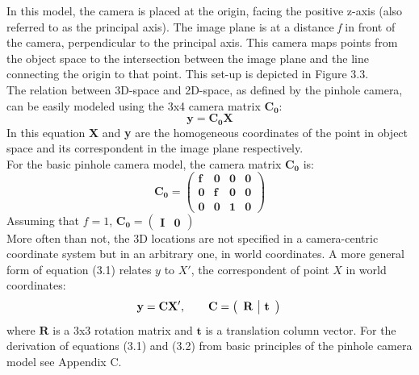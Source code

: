\documentclass[12pt,a4paper,twoside,openright]{report}
\begin{document}
In this model, the camera is placed at the origin, facing the positive z-axis (also referred to as the principal axis). The image plane is at a distance \emph{f} in front of the camera, perpendicular to the principal axis. This camera maps points from the object space to the intersection between the image plane and the line connecting the origin to that point. This set-up is depicted in Figure 3.3.\\
\linebreak
The relation between 3D-space and 2D-space, as defined by the pinhole camera, can be easily modeled using the 3x4 camera matrix $\mathbf{C_{0}}$: 
\begin{equation}
\mathbf{y = C_{0}X}
\end{equation}
In this equation \textbf{X} and \textbf{y} are the homogeneous coordinates of the point in object space and its correspondent in the image plane respectively.\\
For the basic pinhole camera model, the camera matrix $\mathbf{C_{0}}$ is:
\[ \mathbf{C_{0}=\left(\begin{array}{cccc}
f & 0 & 0 & 0 \\
0 & f & 0 & 0 \\
0 & 0 & 1 & 0\end{array} \right)}\] 
Assuming that $f = 1$, $\mathbf{C_{0}} = \left ( \begin{array} {c|c} \mathbf{I} & \mathbf{0} \end{array} \right )$
\\
\linebreak
More often than not, the 3D locations are not specified in a camera-centric coordinate system but in an arbitrary one, in world coordinates. A more general form of equation (3.1) relates $y$ to $X'$, the correspondent of point $X$ in world coordinates:
\begin{equation}
\mathbf{y = CX'},\hspace{20pt} \mathbf{C} = \left ( \begin{array} {c|c} \mathbf{R} & \mathbf{t} \end{array} \right )\\
\end{equation} where $\mathbf{R}$ is a 3x3 rotation matrix and $\mathbf{t}$ is a translation column vector. For the derivation of equations (3.1) and (3.2) from basic principles of the pinhole camera model see Appendix C.\\
\end{document}
